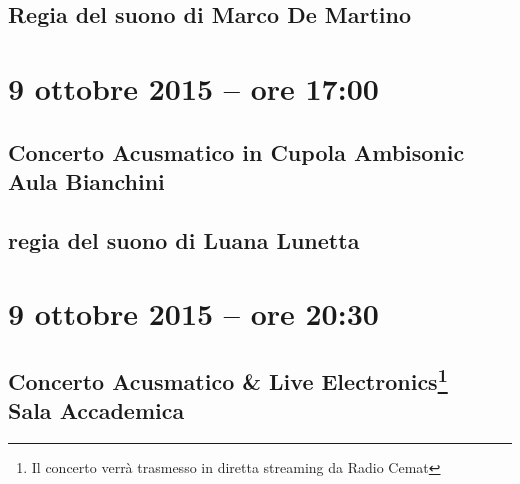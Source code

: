 \documentclass[8pt, twoside, a5paper]{extreport}
\begin{document}
{\fontsize{30}{30} }

\subsection*{\textsf{Regia del suono di Marco De Martino}}

\bigskip

\begin{multicols}{2}




\end{multicols}

\clearpage


\section*{9 ottobre 2015 -- ore 17:00}

\subsection*{{\small Concerto Acusmatico in Cupola Ambisonic} \\
	\textsf{Aula Bianchini}}

{\fontsize{30}{30} }

\subsection*{\textsf{regia del suono di Luana Lunetta}}

\bigskip

\begin{multicols}{2}




\end{multicols}

\clearpage

\section*{9 ottobre 2015 -- ore 20:30}

\subsection*{{\small Concerto Acusmatico \& Live Electronics\footnote{ Il concerto verrà trasmesso in diretta streaming da Radio Cemat}} \\
	\textsf{Sala Accademica}}
\end{document}
